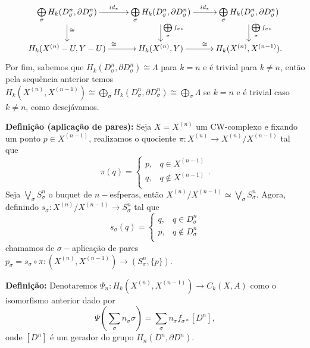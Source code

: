 \documentclass[12pt]{book}
\newcommand{\celula}[2]{D^{#1}_{#2}}
\newcommand{\funcaocond}[5]{
	#1 = 
	\left\{
	\begin{array}{cc}
	#2, & #3\\
	#4, & #5\\
	\end{array}
	\right.
	}
\newcommand{\skeleton}[1]{X^{(#1)}}
\newcommand{\homologiarel}[3]{H_{#1}(#2,#3)}
\newcommand{\homologiarelcel}[3]{H_{#1}(D^{#2}_{#3}, \partial D^{#2}_{#3})}
\newcommand{\homologiarelskelesimpl}[2]{H_{#1}(X^{(#2)}, X^{(#2-1)})}
\newcommand{\somadir}[1]{\bigoplus \limits_{#1}}
\newcommand{\definicao}[1]{\vspace{2mm} \textbf{Definição:}{ #1}}
\newcommand{\definicaonomeada}[2]{\vspace{2mm} \textbf{Definição (#1):}{ #2}}
\begin{document}
{	\[
	\xymatrix{
		\somadir{\sigma} \homologiarelcel{k}{n}{\sigma} \ar[r]^{id_{*}} \ar[d]^{\cong} & 
		\somadir{\sigma} \homologiarelcel{k}{n}{\sigma} \ar[r]^{id_{*}} \ar[d]^{\somadir{\sigma}f_{\sigma*}} & 
		\somadir{\sigma} \homologiarelcel{k}{n}{\sigma} \ar[d]^{\somadir{\sigma}f_{\sigma*}} 
		\\
		\homologiarel{k}{\skeleton{n} - U}{Y- U} \ar[r]^{\cong} & \homologiarel{k}{\skeleton{n}}{Y} \ar[r]^{\cong} & 
		\homologiarelskelesimpl{k}{n}.
	}
	\]
	Por fim, sabemos que $\homologiarelcel{k}{n}{\sigma} \cong \Lambda$ para $k=n$ e é trivial para $k\neq n$, então pela sequência anterior temos $\homologiarelskelesimpl{k}{n} \cong \somadir{\sigma}\homologiarelcel{k}{n}{\sigma} \cong \somadir{\sigma} \Lambda$ se $k=n$ e é trivial caso $k\neq n$, como desejávamos.}

	\definicaonomeada{aplicação de pares}{Seja $X = \skeleton{n}$ um CW-complexo e fixando um ponto $p \in \skeleton{n-1}$, realizamos o quociente $\pi : \skeleton{n} \to \skeleton{n}/\skeleton{n-1}$ tal que 	
	$$
		\pi(q) = 
		\left\{
		\begin{array}{cc}
		p, & q \in \skeleton{n-1}\\
		q, & q \notin \skeleton{n-1}\\
		\end{array}
		\right..
	$$
	Seja $\bigvee_{\sigma} S^{n}_{\sigma}$ o buquet de $n-$esfperas, então $\skeleton{n}/\skeleton{n-1} \simeq \bigvee_{\sigma} S^{n}_{\sigma}$. Agora, definindo $s_{\sigma} : \skeleton{n}/\skeleton{n-1} \to S^{n}_{\sigma}$ tal que 
	$$
	\funcaocond{s_{\sigma}(q)}{q}{q \in \celula{n}{\sigma}}{p}{q \notin \celula{n}{\sigma}}
	$$
	chamamos de $\sigma-$aplicação de pares $p_{\sigma} = s_{\sigma} \circ \pi : (\skeleton{n}, \skeleton{n-1}) \to (S^{n}_{\sigma}, \{p\})$.}
	
	\definicao{Denotaremos $\Psi_{n}:\homologiarelskelesimpl{k}{n} \to C_{k}(X,A)$ como o isomorfismo anterior dado por 
	$$
	\Psi(\sum_{\sigma} n_{\sigma} \sigma) = \sum_{\sigma} n_{\sigma} f_{\sigma *}[D^{n}],
	$$
	onde $[D^{n}]$ é um gerador do grupo $\homologiarelcel{n}{n}{}$.}
\end{document}
